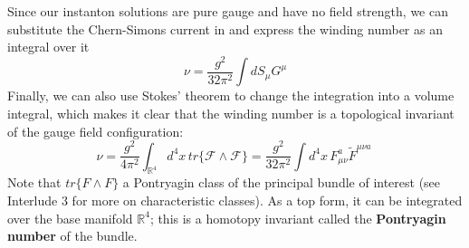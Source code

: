 \documentclass[11pt, oneside]{article}   	%
\theoremstyle{definition}
\begin{document}
Since our instanton solutions are pure gauge and have no field strength, we can substitute the Chern-Simons current in and express the winding 
number as an integral over it
\begin{equation}
	\nu = \frac{g^2}{32\pi^2} \int dS_\mu G^\mu
\end{equation}
Finally, we can also use Stokes' theorem to change the integration into a volume integral, which makes it clear that the winding number is 
a topological invariant of the gauge field configuration:
\begin{equation}
	\nu = \frac{g^2}{4\pi^2} \int_{\mathbb{R}^4} d^4 x\, tr\{\mathcal F\wedge \mathcal F\} = \frac{g^2}{32\pi^2} \int d^4 x\, F_{\mu\nu}^a 
	\tilde F^{\mu\nu a}~
	\label{eq:winding_fwedgef}
\end{equation}
Note that $tr\{F\wedge F\}$ a Pontryagin class of the principal bundle of interest (see Interlude 3 for more on characteristic classes). As a top 
form, it can be integrated over the base manifold $\mathbb R^4$; this is a homotopy invariant called the \textbf{Pontryagin number} of the bundle. 
\end{document}

